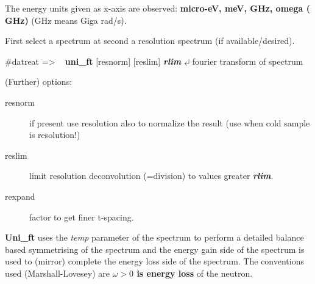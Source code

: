 \documentclass[11pt,fleqn]{book} %
\newcommand{\return}{$\carriagereturn$} %
\newcommand{\sysprompt}{{\color{green}...\textgreater} ~ }
\newcommand{\dtrprompt}{{\color{blue}\#datreat =\textgreater} ~ }
\newcommand{\enter}[1]{{\color{red} \bf #1}}
\newcommand{\var}[1]{{\color{red} \bf \it #1}}
\newcommand{\opt}[1]{[#1]}
\newcommand{\expl}[1]{\hskip 0.5cm {\color{explgray} #1}}
\begin{document}
\begin{exercise}
The energy units given as x-axis are observed: {\bf micro-eV, meV, GHz, omega
( GHz)} (GHz means Giga rad/s).
\end{exercise}

First select a spectrum at second a resolution spectrum (if available/desired).
\begin{corollary}
\dtrprompt {\bf uni\_ft} \opt{resnorm} \opt{reslim} \var{rlim} \return  \expl{fourier transform of spectrum} \\
\end{corollary}

(Further) options:
\begin{description}
\item[resnorm] if present use resolution also to normalize the result (use when cold sample is resolution!)
\item[reslim]  limit resolution deconvolution (=division) to values greater  \var{rlim}.
\item[rexpand] factor to get finer t-spacing.
\end{description}

{\bf Uni\_ft} uses the \emph{temp} parameter of the spectrum to perform a
detailed balance based symmetrising of the spectrum and the energy gain side
of the spectrum is used to (mirror) complete the energy loss side of the spectrum.
The conventions used (Marshall-Lovesey) are {\bf ${\omega > 0}$ is energy loss} of the
neutron.

\end{document}
